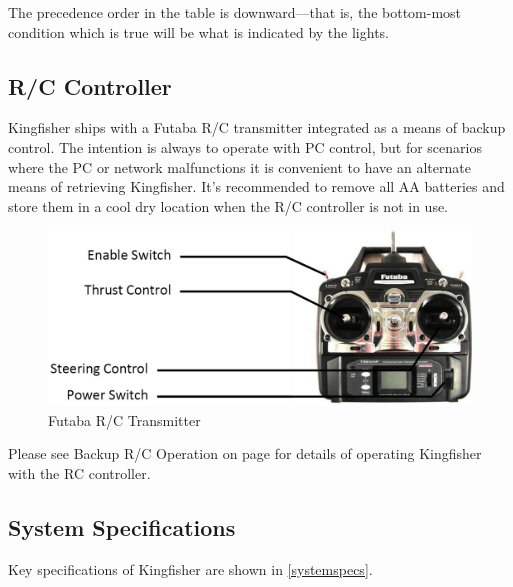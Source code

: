 \documentclass[]{clearpath-latex/clearpath-manual}
\begin{document}
The precedence order in the table is downward—that is, the bottom-most condition which is true will be what is indicated by the lights.

\newpage
\subsection{R/C Controller}
Kingfisher ships with a Futaba R/C transmitter integrated as a means of backup control. The intention is always to operate with PC control, but for scenarios where the PC or network malfunctions it is convenient to have an alternate means of retrieving Kingfisher. It’s recommended to remove all AA batteries and store them in a cool dry location when the R/C controller is not in use.

\begin{figure}[h]
  \centering
  \includegraphics[width=0.75\linewidth]{kf_futaba.PNG}
  \caption{Futaba R/C Transmitter}
  \label{kf_futaba}
\end{figure}

Please see Backup R/C Operation on page \pageref{backupoperation} for details of operating Kingfisher with the RC controller.

\newpage

\subsection{System Specifications}
Key specifications of Kingfisher are shown in \autoref{systemspecs}.
\end{document}
